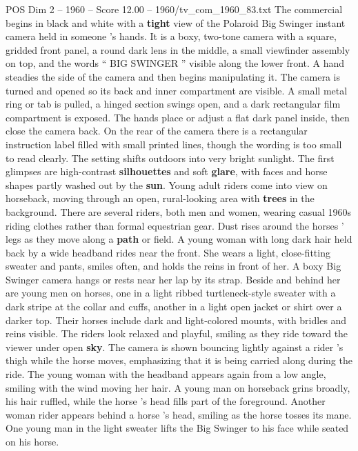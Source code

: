 \begin{textsample}{POS Dim 2 – 1960 – Score 12.00 – 1960/tv\_com\_1960\_83.txt}  \label{ex:f2_pos_019}
The commercial begins in black and white with a \textbf{tight} view of the Polaroid Big Swinger instant camera held in someone ’s hands.
It is a boxy, two-tone camera with a square, gridded front panel, a round dark lens in the middle, a small viewfinder assembly on top, and the words “ BIG SWINGER ” visible along the lower front.
A hand steadies the side of the camera and then begins manipulating it.
The camera is turned and opened so its back and inner compartment are visible.
A small metal ring or tab is pulled, a hinged section swings open, and a dark rectangular film compartment is exposed.
The hands place or adjust a flat dark panel inside, then close the camera back.
On the rear of the camera there is a rectangular instruction label filled with small printed lines, though the wording is too small to read clearly.
The setting shifts outdoors into very bright sunlight.
The first glimpses are high-contrast \textbf{silhouettes} and soft \textbf{glare}, with faces and horse shapes partly washed out by the \textbf{sun}.
Young adult riders come into view on horseback, moving through an open, rural-looking area with \textbf{trees} in the background.
There are several riders, both men and women, wearing casual 1960s riding clothes rather than formal equestrian gear.
Dust rises around the horses ’ legs as they move along a \textbf{path} or field.
A young woman with long dark hair held back by a wide headband rides near the front.
She wears a light, close-fitting sweater and pants, smiles often, and holds the reins in front of her.
A boxy Big Swinger camera hangs or rests near her lap by its strap.
Beside and behind her are young men on horses, one in a light ribbed turtleneck-style sweater with a dark stripe at the collar and cuffs, another in a light open jacket or shirt over a darker top.
Their horses include dark and light-colored mounts, with bridles and reins visible.
The riders look relaxed and playful, smiling as they ride toward the viewer under open \textbf{sky}.
The camera is shown bouncing lightly against a rider ’s thigh while the horse moves, emphasizing that it is being carried along during the ride.
The young woman with the headband appears again from a low angle, smiling with the wind moving her hair.
A young man on horseback grins broadly, his hair ruffled, while the horse ’s head fills part of the foreground.
Another woman rider appears behind a horse ’s head, smiling as the horse tosses its mane.
One young man in the light sweater lifts the Big Swinger to his face while seated on his horse.

\end{textsample}
